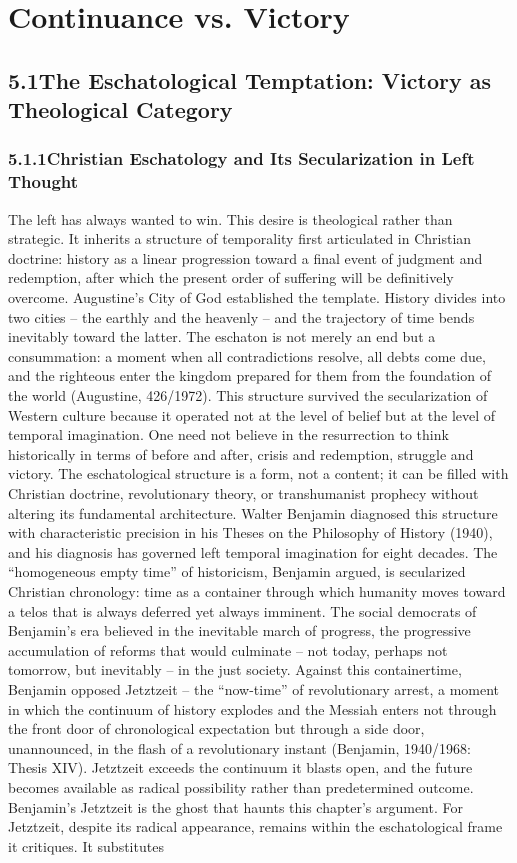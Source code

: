 \chapter{Continuance vs. Victory}
\label{ch:06}

\section{5.1\quad The Eschatological Temptation: Victory as Theological Category}

\subsection{5.1.1\quad Christian Eschatology and Its Secularization in Left Thought}

The left has always wanted to win. This desire is theological rather than strategic. It inherits a structure of temporality first articulated in Christian doctrine: history as a linear progression toward a final event of judgment and redemption, after which the present order of suffering will be definitively overcome. Augustine’s City of God established the template. History divides into two cities – the earthly and the heavenly – and the trajectory of time bends inevitably toward the latter. The eschaton is not merely an end but a consummation: a moment when all contradictions resolve, all debts come due, and the righteous enter the kingdom prepared for them from the foundation of the world (Augustine, 426/1972). This structure survived the secularization of Western culture because it operated not at the level of belief but at the level of temporal imagination. One need not believe in the resurrection to think historically in terms of before and after, crisis and redemption, struggle and victory. The eschatological structure is a form, not a content; it can be filled with Christian doctrine, revolutionary theory, or transhumanist prophecy without altering its fundamental architecture. Walter Benjamin diagnosed this structure with characteristic precision in his Theses on the Philosophy of History (1940), and his diagnosis has governed left temporal imagination for eight decades. The “homogeneous empty time” of historicism, Benjamin argued, is secularized Christian chronology: time as a container through which humanity moves toward a telos that is always deferred yet always imminent. The social democrats of Benjamin’s era believed in the inevitable march of progress, the progressive accumulation of reforms that would culminate – not today, perhaps not tomorrow, but inevitably – in the just society. Against this containertime, Benjamin opposed Jetztzeit – the “now-time” of revolutionary arrest, a moment in which the continuum of history explodes and the Messiah enters not through the front door of chronological expectation but through a side door, unannounced, in the flash of a revolutionary instant (Benjamin, 1940/1968: Thesis XIV). Jetztzeit exceeds the continuum it blasts open, and the future becomes available as radical possibility rather than predetermined outcome. Benjamin’s Jetztzeit is the ghost that haunts this chapter’s argument. For Jetztzeit, despite its radical appearance, remains within the eschatological frame it critiques. It substitutes 
